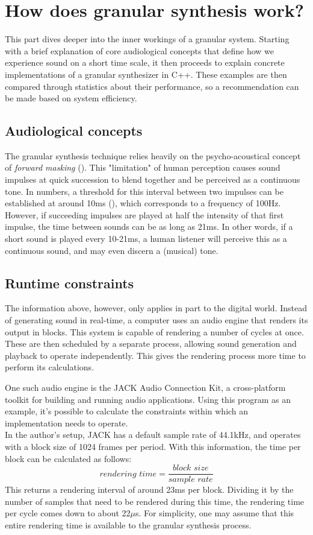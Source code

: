 \documentclass[10pt, twocolumn]{IEEEtran}
\begin{document}
\section{How does granular synthesis work?}
This part dives deeper into the inner workings of a granular system. Starting with a brief explanation of core audiological concepts that define how we experience sound on a short time scale, it then proceeds to explain concrete implementations of a granular synthesizer in C++. These examples are then compared through statistics about their performance, so a recommendation can be made based on system efficiency.

\subsection{Audiological concepts}
The granular synthesis technique relies heavily on the psycho-acoustical concept of \textit{forward masking} (\cite{bates04}). This "limitation" of human perception causes sound impulses at quick succession to blend together and be perceived as a continuous tone. In numbers, a threshold for this interval between two impulses can be established at around 10ms (\cite{gabor47}), which corresponds to a frequency of 100Hz. However, if succeeding impulses are played at half the intensity of that first impulse, the time between sounds can be as long as 21ms. In other words, if a short sound is played every 10-21ms, a human listener will perceive this as a continuous sound, and may even discern a (musical) tone.

\subsection{Runtime constraints}
The information above, however, only applies in part to the digital world. Instead of generating sound in real-time, a computer uses an audio engine that renders its output in blocks. This system is capable of rendering a number of cycles at once. These are then scheduled by a separate process, allowing sound generation and playback to operate independently. This gives the rendering process more time to perform its calculations.

One such audio engine is the JACK Audio Connection Kit, a cross-platform toolkit for building and running audio applications. Using this program as an example, it's possible to calculate the constraints within which an implementation needs to operate.\\
In the author's setup, JACK has a default sample rate of 44.1kHz, and operates with a block size of 1024 frames per period. With this information, the time per block can be calculated as follows:
\[
	\textit{rendering time} = \frac{\textit{block size}}{\textit{sample rate}}
\]
This returns a rendering interval of around 23ms per block. Dividing it by the number of samples that need to be rendered during this time, the rendering time per cycle comes down to about 22$\mu$s. For simplicity, one may assume that this entire rendering time is available to the granular synthesis process.
\end{document}

